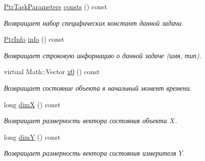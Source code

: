 \begin{DoxyCompactItemize}
\hypertarget{class_core_1_1_task_aaf441bb60b373d5b8ffb852215b0318e}{}\label{class_core_1_1_task_aaf441bb60b373d5b8ffb852215b0318e} 
\hyperlink{namespace_core_a3e0e555656bf795146ebb0882e28da2f}{Ptr\+Task\+Parameters} \hyperlink{class_core_1_1_task_aaf441bb60b373d5b8ffb852215b0318e}{consts} () const
\begin{DoxyCompactList}\small\item\em Возвращает набор специфических констант данной задачи. \end{DoxyCompactList}\item 
\hypertarget{class_core_1_1_task_a94634b748d776df3acad7940024bfb05}{}\label{class_core_1_1_task_a94634b748d776df3acad7940024bfb05} 
\hyperlink{namespace_core_a647483da8a1266d5bbd3e9bb5cd66d08}{Ptr\+Info} \hyperlink{class_core_1_1_task_a94634b748d776df3acad7940024bfb05}{info} () const
\begin{DoxyCompactList}\small\item\em Возвращает строковую информацию о данной задаче (имя, тип). \end{DoxyCompactList}\item 
virtual Math\+::\+Vector \hyperlink{class_core_1_1_task_aa550c0258f341215291fba1e8518c135}{x0} () const
\begin{DoxyCompactList}\small\item\em Возвращает состояние объекта в начальный момент времени. \end{DoxyCompactList}\item 
\hypertarget{class_core_1_1_task_aa1b5dadc2fce5b598976b453bc9cbc5c}{}\label{class_core_1_1_task_aa1b5dadc2fce5b598976b453bc9cbc5c} 
long \hyperlink{class_core_1_1_task_aa1b5dadc2fce5b598976b453bc9cbc5c}{dimX} () const
\begin{DoxyCompactList}\small\item\em Возвращает размерность вектора состояния объекта $X$. \end{DoxyCompactList}\item 
\hypertarget{class_core_1_1_task_adf6ea75989335fe1c2615d1ba1ef5d30}{}\label{class_core_1_1_task_adf6ea75989335fe1c2615d1ba1ef5d30} 
long \hyperlink{class_core_1_1_task_adf6ea75989335fe1c2615d1ba1ef5d30}{dimY} () const
\begin{DoxyCompactList}\small\item\em Возвращает размерность вектора состояния измерителя $Y$. \end{DoxyCompactList}\item 
\hypertarget{class_core_1_1_task_add33d4a561733297f8e6d6c01ffc3972}{}\label{class_core_1_1_task_add33d4a561733297f8e6d6c01ffc3972} 

\end{DoxyCompactItemize}
